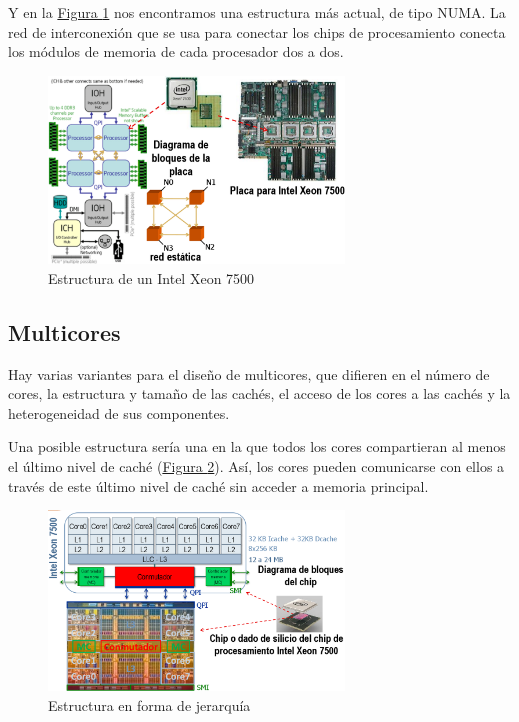 \documentclass[10pt,a4paper,spanish]{report}
\begin{document}
Y en la \hyperref[intel_7500]{Figura \ref*{intel_7500}} nos encontramos una estructura más actual, de tipo NUMA. La red de interconexión que se usa para conectar los chips de procesamiento conecta los módulos de memoria de cada procesador dos a dos.

\begin{figure}[!h]
\centering
\includegraphics[width=0.7\textwidth]{54}
\caption{Estructura de un Intel Xeon 7500}
\label{intel_7500}
\end{figure}

\textcolor[rgb]{0.2,0.4,0.8}{\subsection{Multicores}}


Hay varias variantes para el diseño de multicores, que difieren en el número de cores, la estructura y tamaño de las cachés, el acceso de los cores a las cachés y la heterogeneidad de sus componentes.

Una posible estructura sería una en la que todos los cores compartieran al menos el último nivel de caché (\hyperref[je]{Figura \ref*{je}}). Así, los cores pueden comunicarse con ellos a través de este último nivel de caché sin acceder a memoria principal.

\begin{figure}[!h]
\centering
\includegraphics[width=0.7\textwidth]{55}
\caption{Estructura en forma de jerarquía}
\label{je}
\end{figure}
\end{document}
